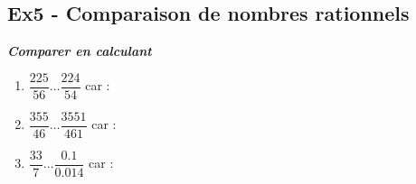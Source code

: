 \documentclass[11pt]{article}
\begin{document}
\subsection*{Ex5 - Comparaison de nombres rationnels}

\textit{\textbf{Comparer en calculant}}

\begin{enumerate}
\item $ \dfrac{225}{56} \ldots \dfrac{224}{54} $  car : \dotfill
\item $ \dfrac{355}{46} \ldots \dfrac{3551}{461} $  car : \dotfill
\item $ \dfrac{33}{7} \ldots \dfrac{0.1}{0.014} $  car : \dotfill

\end{enumerate}
\end{document}
